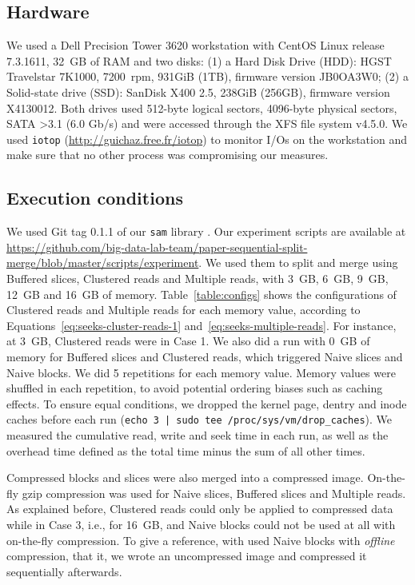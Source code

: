 \documentclass[10pt, conference, compsocconf]{IEEEtran}
\newcommand{\todo}[1]{\marginpar{\parbox{18mm}{\flushleft\tiny\color{red}\textbf{TODO}:
      #1}}}
\begin{document}
\subsection{Hardware}
We used a Dell Precision Tower 3620 workstation with CentOS Linux
release 7.3.1611, 32~GB of RAM and two disks: (1) a Hard Disk Drive
(HDD): HGST Travelstar 7K1000, 7200~rpm, 931GiB (1TB), firmware
version JB0OA3W0; (2) a Solid-state drive (SSD): SanDisk X400 2.5,
238GiB (256GB), firmware version X4130012.  Both drives used 512-byte
logical sectors, 4096-byte physical sectors, SATA \textgreater 3.1 (6.0 Gb/s) and
were accessed through the XFS file system v4.5.0. We used
\texttt{iotop} (\url{http://guichaz.free.fr/iotop}) to monitor I/Os on
the workstation and make sure that no other process was compromising
our measures.

\subsection{Execution conditions}

We used Git tag 0.1.1 of our \texttt{sam} library \todo{tag it}. Our
experiment scripts are available at
\url{https://github.com/big-data-lab-team/paper-sequential-split-merge/blob/master/scripts/experiment}. We
used them to split and merge using Buffered slices, Clustered reads and
Multiple reads, with 3~GB, 6~GB, 9~GB, 12~GB and 16~GB of
memory. Table~\ref{table:configs} shows the configurations of Clustered
reads and Multiple reads for each memory value, according to
Equations~\ref{eq:seeks-cluster-reads-1}
and~\ref{eq:seeks-multiple-reads}. For instance, at 3~GB, Clustered reads were in
Case 1. We also did a run with 0~GB of memory for Buffered slices and
Clustered reads, which triggered Naive slices and Naive blocks. We did 5
repetitions for each memory value. Memory values were shuffled in each
repetition, to avoid potential ordering biases such
as caching effects. To ensure equal conditions, we dropped the kernel
page, dentry and inode caches before each run (\texttt{echo 3 | sudo
  tee /proc/sys/vm/drop\_caches}). We measured the cumulative read,
write and seek time in each run, as well as the overhead time defined
as the total time minus the sum of all other times.

Compressed blocks and slices were also merged into a compressed
image. On-the-fly gzip compression was used for Naive slices, Buffered
slices and Multiple reads. As explained before, Clustered reads could
only be applied to compressed data while in Case 3, i.e., for 16~GB,
and Naive blocks could not be used at all with on-the-fly
compression. To give a reference, with used Naive blocks with
\emph{offline} compression, that it, we wrote an uncompressed image
and compressed it sequentially afterwards. \todo{confirm that.}
\end{document}
